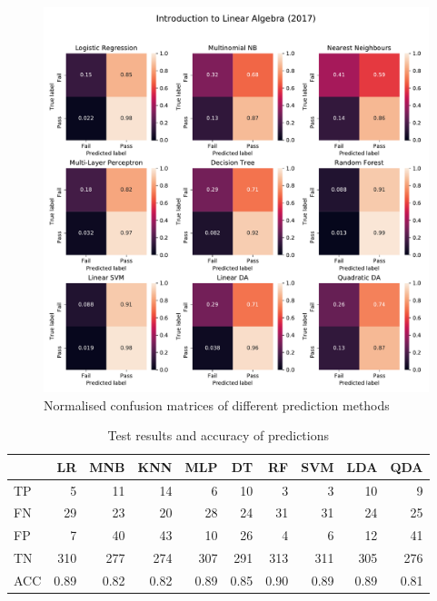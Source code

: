 \documentclass[a4paper]{report}
\begin{document}
\begin{figure}[H]
  \centering
  \includegraphics[width=\linewidth]{fig/ML_ILA_bin_17.pdf}
  \caption{\label{fig:ML_ILA_bin_17}Normalised confusion matrices of different prediction methods}
\end{figure}

\begin{table}[H]
  \centering
  \begin{tabular}{lrrrrrrrrr}
    \toprule
    {} &   LR &  MNB &  KNN &  MLP &   DT &   RF &  SVM &  LDA &  QDA \\
    \midrule
    TP  &    5 &   11 &   14 &    6 &   10 &    3 &    3 &   10 &    9 \\
    FN  &   29 &   23 &   20 &   28 &   24 &   31 &   31 &   24 &   25 \\
    FP  &    7 &   40 &   43 &   10 &   26 &    4 &    6 &   12 &   41 \\
    TN  &  310 &  277 &  274 &  307 &  291 &  313 &  311 &  305 &  276 \\
    ACC & 0.89 & 0.82 & 0.82 & 0.89 & 0.85 & 0.90 & 0.89 & 0.89 & 0.81 \\
    \bottomrule
  \end{tabular}
  \caption{\label{tab:ML_ILA_bin_17}Test results and accuracy of predictions}
\end{table}
\end{document}
